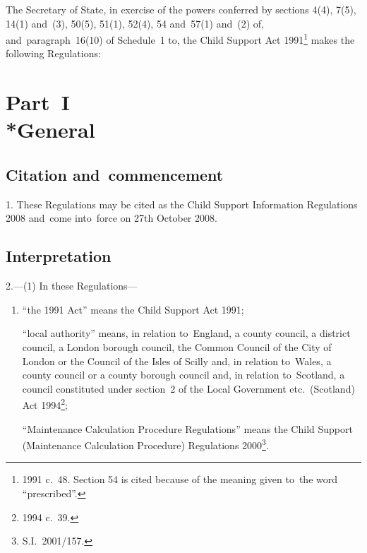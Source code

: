 \documentclass[12pt,a4paper]{article}
\title{\regstitle}
\author{S.I.\ 2008 No.\ 2551}
\date{Made
26th September 2008\\
Laid before Parliament
2nd October 2008\\
Coming into~force
27th October 2008
}
\begin{document}
\maketitle

\noindent
The Secretary of State, in exercise of the powers conferred by sections 4(4), 7(5), 14(1) and~(3), 50(5), 51(1), 52(4), 54 and~57(1) and~(2) of, and~paragraph~16(10) of Schedule~1 to, the Child Support Act 1991\footnote{1991 c.~48. Section 54 is cited because of the meaning given to~the word “prescribed”.} makes the following Regulations: 

{\sloppy

\tableofcontents

}

\bigskip

\setcounter{secnumdepth}{-2}

\section[Part~I --- General]{Part~I\\*General}

\renewcommand\parthead{--- Part~I}

\subsection[1. Citation and~commencement]{Citation and~commencement}

1.  These Regulations may be cited as the Child Support Information Regulations 2008 and~come into~force on 27th October 2008.

\subsection[2. Interpretation]{Interpretation}

2.---(1)  In these Regulations—
\begin{enumerate}\item[]
“the 1991 Act” means the Child Support Act 1991;

“local authority” means, in relation to~England, a county council, a district council, a London borough council, the Common Council of the City of London or the Council of the Isles of Scilly and, in relation to~Wales, a county council or a county borough council and, in relation to~Scotland, a council constituted under section~2 of the Local Government etc.\ (Scotland) Act 1994\footnote{1994 c.~39.};

“Maintenance Calculation Procedure Regulations” means the Child Support (Maintenance Calculation Procedure) Regulations 2000\footnote{S.I.~2001/157.}.
\end{enumerate}
\end{document}
